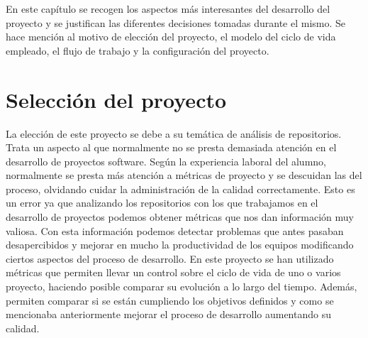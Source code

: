 


En este capítulo se recogen los aspectos más interesantes del desarrollo del proyecto y se justifican las diferentes decisiones tomadas durante el mismo. Se hace mención al motivo de elección del proyecto, el modelo del ciclo de vida empleado, el flujo de trabajo y la configuración del proyecto.


\section{Selección del proyecto}

La elección de este proyecto se debe a su temática de análisis de repositorios. Trata un aspecto al que normalmente no se presta demasiada atención en el desarrollo de proyectos software. Según la experiencia laboral del alumno, normalmente se presta más atención a métricas de proyecto y se descuidan las del proceso, olvidando cuidar la administración de la calidad correctamente.
Esto es un error ya que analizando los repositorios con los que trabajamos en el desarrollo de proyectos podemos obtener métricas que nos dan información muy valiosa. Con esta información podemos detectar problemas que antes pasaban desapercibidos y mejorar en mucho la productividad de los equipos modificando ciertos aspectos del proceso de desarrollo.
En este proyecto se han utilizado métricas que permiten llevar un control sobre el ciclo de vida de uno o varios proyecto, haciendo posible comparar su evolución a lo largo del tiempo. Además, permiten comparar si se están cumpliendo los objetivos definidos y como se mencionaba anteriormente mejorar el proceso de desarrollo aumentando su calidad.


